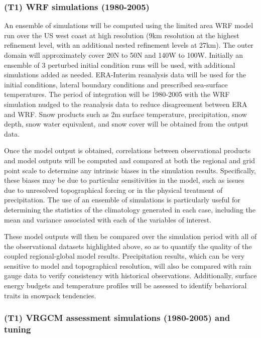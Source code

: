 \documentclass[11pt]{article}
\begin{document}
\subsubsection{(T1) WRF simulations (1980-2005)}

An ensemble of simulations will be computed using the limited area WRF model run over the US west coast at high resolution (9km resolution at the highest refinement level, with an additional nested refinement levels at 27km). The outer domain will approximately cover 20N to 50N and 140W to 100W. Initially an ensemble of 3 perturbed initial condition runs will be used, with additional simulations added as needed. ERA-Interim reanalysis data will be used for the initial conditions, lateral boundary conditions and prescribed sea-surface temperatures. The period of integration will be 1980-2005 with the WRF simulation nudged to the reanalysis data to reduce disagreement between ERA and WRF. Snow products such as 2m surface temperature, precipitation, snow depth, snow water equivalent, and snow cover will be obtained from the output data.

Once the model output is obtained, correlations between observational products and model outputs will be computed and compared at both the regional and grid point scale to determine any intrinsic biases in the simulation results. Specifically, these biases may be due to particular sensitivities in the model, such as issues due to unresolved topographical forcing or in the physical treatment of precipitation. The use of an ensemble of simulations is particularly useful for determining the statistics of the climatology generated in each case, including the mean and variance associated with each of the variables of interest.

These model outputs will then be compared over the simulation period with all of the observational datasets highlighted above, so as to quantify the quality of the coupled regional-global model results. Precipitation results, which can be very sensitive to model and topographical resolution, will also be compared with rain gauge data to verify consistency with historical observations.  Additionally, surface energy budgets and temperature profiles will be assessed to identify behavioral traits in snowpack tendencies.



\subsubsection{(T1) VRGCM assessment simulations (1980-2005) and tuning}
\end{document}
